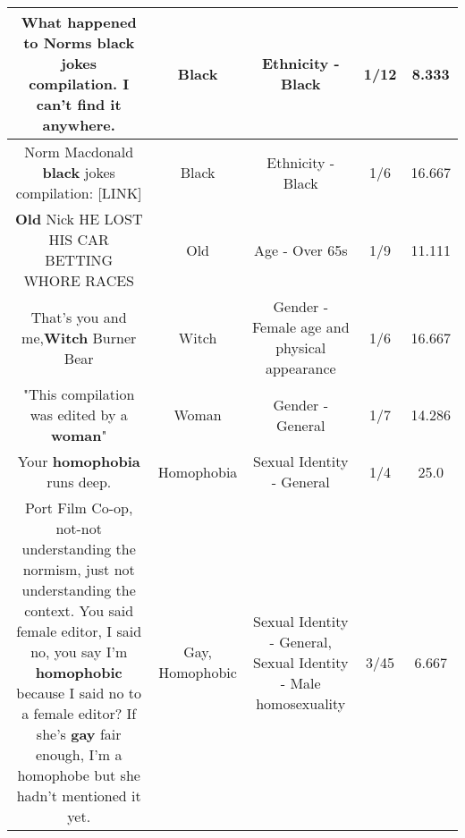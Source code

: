 \documentclass[11pt]{article}
\newlength\mylength
\begin{document}
\begin{center}
\begin{longtable}{|C{.65\mylength}|C{.30\mylength}|C{.12\mylength}|C{.12\mylength}|C{.12\mylength}|}
  \small What happened to Norms \textbf{black} jokes compilation. I can't find it anywhere.\normalsize   & Black & Ethnicity - Black & 1/12 & 8.333 \\  \hline
  \small Norm Macdonald \textbf{black} jokes compilation:  [LINK] \normalsize   & Black & Ethnicity - Black & 1/6 & 16.667 \\  \hline
  \small \@\textbf{Old} Nick HE LOST HIS CAR BETTING WHORE RACES\normalsize   & Old & Age - Over 65s & 1/9 & 11.111 \\  \hline
  \small That's you and me,\@\textbf{Witch} Burner Bear\normalsize   & Witch & Gender - Female age and physical appearance & 1/6 & 16.667 \\  \hline
  \small "This compilation was edited by a \textbf{woman}"\normalsize   & Woman & Gender - General & 1/7 & 14.286 \\  \hline
  \small Your \textbf{homophobia} runs deep.\normalsize   & Homophobia & Sexual Identity - General & 1/4 & 25.0 \\  \hline
  \small Port Film Co-op, not-not understanding the normism, just not understanding the context. You said female editor, I said no, you say I'm \textbf{homophobic} because I said no to a female editor? If she's \textbf{g\textbf{ay}} fair enough, I'm a homophobe but she hadn't mentioned it yet.\normalsize   & Gay, Homophobic & Sexual Identity - General, Sexual Identity - Male homosexuality & 3/45 & 6.667 \\  \hline
  
\end{longtable}
\end{center}
\end{document}
